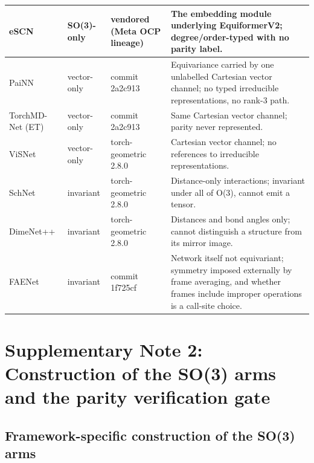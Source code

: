 \begin{table}[htbp]
\begin{tabular}{@{}>{\raggedright\arraybackslash}p{2.2cm} l >{\raggedright\arraybackslash}p{1.9cm} >{\raggedright\arraybackslash}p{6.0cm}@{}}
eSCN & SO(3)-only & vendored (Meta OCP lineage) & The embedding module underlying EquiformerV2; degree/order-typed with no parity label. \\
\midrule
PaiNN\cite{schutt2021painn} & vector-only & commit 2a2c913 & Equivariance carried by one unlabelled Cartesian vector channel; no typed irreducible representations, no rank-3 path. \\
TorchMD-Net (ET)\cite{tholke2022torchmdnet} & vector-only & commit 2a2c913 & Same Cartesian vector channel; parity never represented. \\
ViSNet\cite{wang2024visnet} & vector-only & torch-geometric 2.8.0 & Cartesian vector channel; no references to irreducible representations. \\
\midrule
SchNet\cite{schutt2017schnet} & invariant & torch-geometric 2.8.0 & Distance-only interactions; invariant under all of O(3), cannot emit a tensor. \\
DimeNet++\cite{gasteiger2020dimenetpp} & invariant & torch-geometric 2.8.0 & Distances and bond angles only; cannot distinguish a structure from its mirror image. \\
FAENet\cite{duval2023faenet} & invariant & commit 1f725cf & Network itself not equivariant; symmetry imposed externally by frame averaging, and whether frames include improper operations is a call-site choice. \\
\bottomrule
\end{tabular}
\end{table}

\section*{Supplementary Note 2: Construction of the SO(3) arms and the parity verification gate}

\subsection*{Framework-specific construction of the SO(3) arms}

